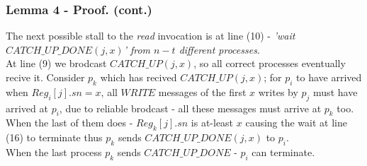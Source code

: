 \begin{frame}
    \frametitle{Lemma 4 - Proof. (cont.)}
    The next possible stall to the \emph{read} invocation is at line (10) -
    \emph{'wait $CATCH\_UP\_DONE(j,x)$' from $n-t$ different processes}.\\
    At line (9) we brodcast $CATCH\_UP(j,x)$, so all correct processes
    eventually recive it. Consider $p_k$ which has recived $CATCH\_UP(j,x)$;
    for $p_i$ to have arrived when $Reg_i[j].sn=x$, all $WRITE$ messages 
    of the first $x$ writes by $p_j$ must have arrived at $p_i$, due to reliable
    brodcast - all these messages must arrive at $p_k$ too. When the last of them does - 
    $Reg_k[j].sn$ is at-least $x$ causing the wait at line (16) to terminate thus
    $p_k$ sends $CATCH\_UP\_DONE(j,x)$ to $p_i$.\\
    When the last process $p_k$ sends $CATCH\_UP\_DONE$ - $p_i$ can terminate.
\end{frame}


